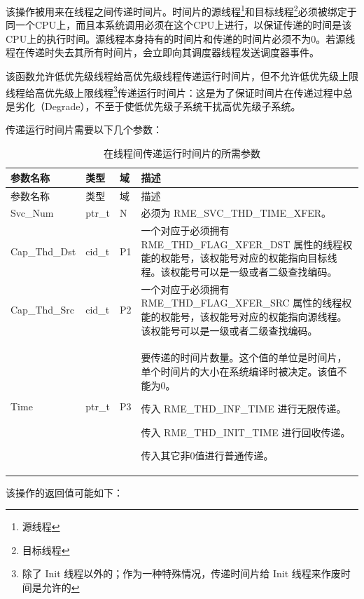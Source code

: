 该操作被用来在线程之间传递时间片。时间片的源线程\footnote{源线程}和目标线程\footnote{目标线程}必须被绑定于同一个CPU上，而且本系统调用必须在这个CPU上进行，以保证传递的时间是该CPU上的执行时间。源线程本身持有的时间片和传递的时间片必须不为0。若源线程在传递时失去其所有时间片，会立即向其调度器线程发送调度器事件。

该函数允许低优先级线程给高优先级线程传递运行时间片，但不允许低优先级上限线程给高优先级上限线程\footnote{除了 Init 线程以外的；作为一种特殊情况，传递时间片给 Init 线程来作废时间是允许的}传递运行时间片：这是为了保证时间片在传递过程中总是劣化（Degrade），不至于使低优先级子系统干扰高优先级子系统。

传递运行时间片需要以下几个参数：

\begin{xltabular}{\textwidth}{@{}>{\hsize\raggedright\arraybackslash}X>{\hsize\raggedright\arraybackslash}X>{\hsize\raggedright\arraybackslash}X>{\hsize\raggedright\arraybackslash}X@{}}
\caption{在线程间传递运行时间片的所需参数}\label{tab:4-34-transfer-run-time-slice-between-threads-parameters}\\
\toprule
参数名称 & 类型 & 域 & 描述\tabularnewline
\endfirsthead
\toprule
参数名称 & 类型 & 域 & 描述\tabularnewline
\midrule
\endhead
\bottomrule
\endlastfoot
Svc\_Num & ptr\_t & N & 必须为 RME\_SVC\_THD\_TIME\_XFER。\tabularnewline
Cap\_Thd\_Dst & cid\_t & P1 &
一个对应于必须拥有 RME\_THD\_FLAG\_XFER\_DST 属性的线程权能的权能号，该权能号对应的权能指向目标线程。该权能号可以是一级或者二级查找编码。\tabularnewline
Cap\_Thd\_Src & cid\_t & P2 &
一个对应于必须拥有 RME\_THD\_FLAG\_XFER\_SRC 属性的线程权能的权能号，该权能号对应的权能指向源线程。该权能号可以是一级或者二级查找编码。\tabularnewline
Time\strut
 & ptr\_t\strut
 & P3\strut
 & 要传递的时间片数量。这个值的单位是时间片，单个时间片的大小在系统编译时被决定。该值不能为0。

传入 RME\_THD\_INF\_TIME 进行无限传递。

传入 RME\_THD\_INIT\_TIME 进行回收传递。

传入其它非0值进行普通传递。\strut
\tabularnewline
\end{xltabular}

该操作的返回值可能如下：

